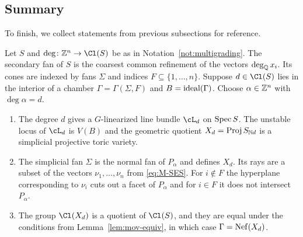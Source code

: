 \documentclass{article}
\begin{document}
\subsection{Summary}
To finish, we collect statements from previous subsections for reference.

\begin{thm}\label{thm:main-secondary}
  Let $S$ and $\deg\colon\ZZ^n\to\Cl(S)$ be as in Notation~\ref{not:multigrading}.  The secondary fan of $S$ is the coarsest common refinement of the vectors $\deg_\mathbb Q x_i$.  Its cones are indexed by fans $\Sigma$ and indices $F\subseteq\{1,\ldots,n\}$.  Suppose $d\in\Cl(S)$ lies in the interior of a chamber $\Gamma=\Gamma(\Sigma,F)$ and $B=\operatorname{ideal}(\Gamma)$.  Choose $\alpha\in\mathbb Z^n$ with $\deg\alpha=d$.
  \begin{enumerate}
    \item  The degree $d$ gives a $G$-linearized line bundle $\cL_d$ on $\operatorname{Spec} S$.  The unstable locus of $\cL_d$ is $V(B)$ and the geometric quotient $X_d=\operatorname{Proj} S_{\mathbb N d}$ is a simplicial projective toric variety.
    \item  The simplicial fan $\Sigma$ is the normal fan of $P_\alpha$ and defines $X_d$.  Its rays are a subset of the vectors $\nu_1,\ldots,\nu_n$ from \eqref{eq:M-SES}.  For $i\notin F$ the hyperplane corresponding to $\nu_i$ cuts out a facet of $P_\alpha$ and for $i\in F$ it does not intersect $P_\alpha$.
    \item  The group $\Cl(X_d)$ is a quotient of $\Cl(S)$, and they are equal under the conditions from Lemma~\ref{lem:mov-equiv}, in which case $\Gamma=\operatorname{Nef}(X_d)$.
  \end{enumerate}
\end{thm}
\end{document}
